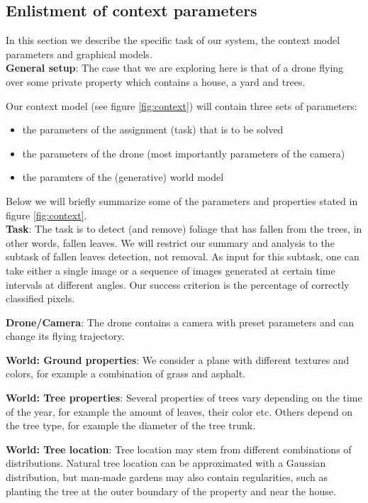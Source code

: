\documentclass[fleqn,10pt]{SelfArx} %
\begin{document}
\subsection{Enlistment of context parameters}
In this section we describe the specific task of our system, the context model parameters and graphical models.\\
\textbf{General setup}: The case that we are exploring here is that of a drone flying over some private property which contains a house, a yard and trees. 

Our context model (see figure \ref{fig:context}) will contain three sets of parameters:

\begin{itemize}
 \item the parameters of the assignment (task) that is to be solved
 \item the parameters of the drone (most importantly parameters of the camera)
 \item the paramters of the (generative) world model
\end{itemize}

Below we will briefly summarize some of the parameters and properties stated in figure \ref{fig:context}.  \\

\textbf{Task}: The task is to detect (and remove) foliage that has fallen from the trees, in other words, fallen leaves. We will restrict our summary and analysis to the subtask of fallen leaves detection, not removal. As input for this subtask, one can take either a single image or a sequence of images generated at certain time intervals at different angles. Our success criterion is the percentage of correctly classified pixels.

\textbf{Drone/Camera}: The drone contains a camera with preset parameters and can change its flying trajectory. 

\textbf{World: Ground properties}: We consider a plane with different textures and colors, for example a combination of grass and asphalt.

\textbf{World: Tree properties}: Several properties of trees vary depending on the time of the year, for example the amount of leaves, their color etc. Others depend on the tree type, for example the diameter of the tree trunk.

\textbf{World: Tree location}: Tree location may stem from different combinations of distributions. Natural tree location can be approximated with a Gaussian distribution, but man-made gardens may also contain regularities, such as planting the tree at the outer boundary of the property and near the house.
\end{document}
